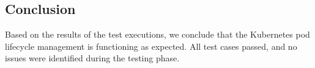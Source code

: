 \documentclass[main.tex]{subfiles}
\begin{document}
\subsection{Conclusion}
Based on the results of the test executions, we conclude that the Kubernetes pod lifecycle management is functioning as expected. All test cases passed, and no issues were identified during the testing phase.
\end{document}
